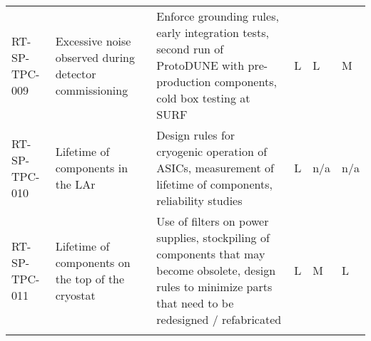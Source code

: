 \begin{footnotesize}
\begin{longtable}{x{0.18\textwidth}x{0.20\textwidth}x{0.32\textwidth}x{0.02\textwidth}x{0.02\textwidth}x{0.02\textwidth}}
RT-SP-TPC-009 & Excessive noise observed during detector commissioning & Enforce grounding rules, early integration tests, second run of ProtoDUNE with pre-production components, cold box testing at SURF & L & L & M \\  \colhline
RT-SP-TPC-010 & Lifetime of components in the LAr & Design rules for cryogenic operation of ASICs, measurement of lifetime of components, reliability studies & L & n/a & n/a \\  \colhline
RT-SP-TPC-011 & Lifetime of components on the top of the cryostat & Use of filters on power supplies, stockpiling of components that may become obsolete, design rules to minimize parts that need to be redesigned / refabricated & L & M & L \\  \colhline

\label{tab:risks:SP-FD-TPCELEC}
\end{longtable}
\end{footnotesize}